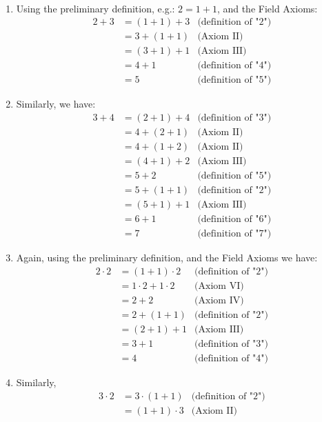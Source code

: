 \documentclass[12pt]{book}
\theoremstyle{definition}
\begin{document}
\begin{sol}
\
\begin{enumerate}[label=(\alph*)]
	\item Using the preliminary definition, e.g.: $2=1+1$, and the Field Axioms:
		\begin{align*}
			2+3 &= (1+1)+3 &\text{(definition of "2")}\\
			&= 3+ (1+1) & \text{(Axiom II)}\\
			&= (3+1)+1 &\text{(Axiom III)}\\
			&= 4+1 &\text{(definition of "4")}\\
			&=5 &\text{(definition of "5")} 
		\end{align*}
 	\item Similarly, we have:
 		\begin{align*}
 			3+4 &= (2+1)+4 &\text{(definition of "3")}\\
 			&= 4+(2+1) &\text{(Axiom II)}\\
 			&= 4+(1+2) &\text{(Axiom II)}\\
 			&= (4+1)+2 &\text{(Axiom III)}\\
 			&= 5+2 &\text{(definition of "5")}\\
 			&= 5+(1+1) &\text{(definition of "2")}\\
 			&= (5+1)+1 & \text{(Axiom III)}\\
 			&= 6+1 & \text{(definition of "6")}\\
 			&= 7 &\text{(definition of "7")}	
 		\end{align*}
	\item Again, using the preliminary definition, and the Field Axioms we have:
		\begin{align*}
			2\cdot 2 &= (1+1)\cdot 2 & \text{(definition of "2")}\\
			&= 1\cdot 2 + 1 \cdot 2 & \text{(Axiom VI)}\\
			&= 2+2 &\text{(Axiom IV)}\\
			&= 2+(1+1) & \text{(definition of "2")}\\
			&= (2+1)+1 & \text{(Axiom III)}\\
			&= 3+1 & \text{(definition of "3")}\\
			&= 4 & \text{(definition of "4")}
		\end{align*}
	\item Similarly, 
		\begin{align*}
			3 \cdot 2 &= 3\cdot (1+1) & \text{(definition of "2")}\\
			&= (1+1)\cdot 3& \text{(Axiom II)}\\

\end{align*}
\end{enumerate}
\end{sol}
\end{document}
